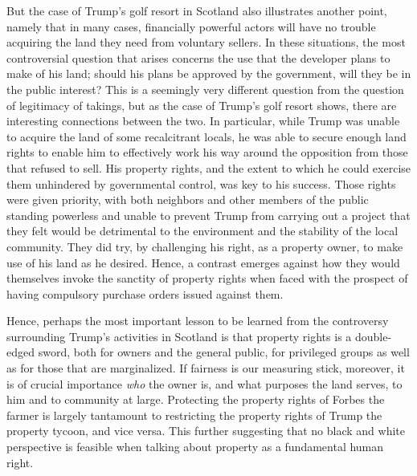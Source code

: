 But the case of Trump's golf resort in Scotland also illustrates another point, namely that in many cases, financially powerful actors will have no trouble acquiring the land they need from voluntary sellers. In these situations, the most controversial question that arises concerns the use that the developer plans to make of his land; should his plans be approved by the government, will they be in the public interest? This is a seemingly very different question from the question of legitimacy of takings, but as the case of Trump's golf resort shows, there are interesting connections between the two. In particular, while Trump was unable to acquire the land of some recalcitrant locals, he was able to secure enough land rights to enable him to effectively work his way around the opposition from those that refused to sell. His property rights, and the extent to which he could exercise them unhindered by governmental control, was key to his success. Those rights were given priority, with  both neighbors and other members of the public standing  powerless and  unable to prevent Trump from carrying out a project that they felt would be detrimental to the environment and the stability of the local community. They did try, by challenging his right, as a property owner, to make use of his land as he desired. Hence, a contrast emerges against how they would themselves invoke the sanctity of property rights when faced with the prospect of having compulsory purchase orders issued against them. 

Hence, perhaps the most important lesson to be learned from the controversy surrounding Trump's activities in Scotland is that property rights is a double-edged sword, both for owners and the general public, for privileged groups as well as for those that are  marginalized. If fairness is our measuring stick, moreover, it is of crucial importance {\it who} the owner is, and what purposes the land serves, to him and to community at large. Protecting the property rights of Forbes the farmer is largely tantamount to restricting the property rights of Trump the property tycoon, and vice versa. This further suggesting that no black and white perspective is feasible when talking about property as a fundamental human right. 

